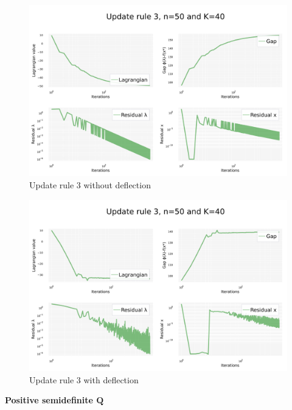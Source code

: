 \documentclass[notitlepage]{article}
\begin{document}
\begin{figure}[H]
  \centering
  \includegraphics[scale=0.25]{pics/pd_q/Rule=3_n=50_K=40_defl=false.png}
  \caption{Update rule 3 without deflection}
  \label{fig:rule-3-n-50-k-40}
\end{figure}

\begin{figure}[H]
  \centering
  \includegraphics[scale=0.25]{pics/pd_q/Rule=3_n=50_K=40_defl=true.png}
  \caption{Update rule 3 with deflection}
  \label{fig:rule-3-n-50-k-40-defl}
\end{figure}

\newpage

\begin{center}
  {\Large\bfseries Positive semidefinite $\mathbf{Q}$}
\end{center}
\end{document}
